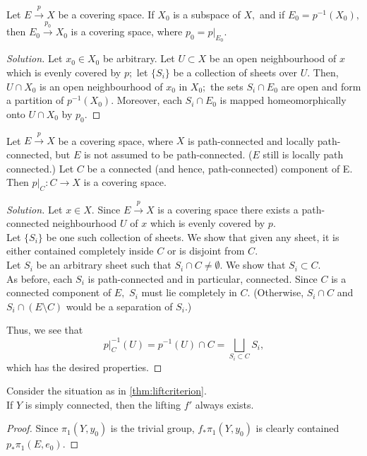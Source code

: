 \documentclass[12pt]{article}
\newenvironment{soln}{\begin{proof}[Solution]}{\end{proof}}
\begin{document}
\begin{exe} \label{exe:coveringspacerestrictiscovering1}
	Let $E\overset{p}{\longrightarrow}X$ be a covering space. If $X_0$ is a subspace of $X,$ and if $E_0 = p^{-1}(X_0),$ then $E_0\overset{p_0}{\longrightarrow}X_0$ is a covering space, where $p_0 = p|_{E_0}.$
\end{exe}
\begin{soln}
	Let $x_0 \in X_0$ be arbitrary. Let $U \subset X$ be an open neighbourhood of $x$ which is evenly covered by $p;$ let $\{S_i\}$ be a collection of sheets over $U.$ Then, $U \cap X_0$ is an open neighbourhood of $x_0$ in $X_0;$ the sets $S_i\cap E_0$ are open and form a partition of $p^{-1}(X_0).$ Moreover, each $S_i\cap E_0$ is mapped homeomorphically onto $U \cap X_0$ by $p_0.$
\end{soln}

\begin{exe} \label{exe:coveringspacerestrictiscovering2}
	Let $E\overset{p}{\longrightarrow}X$ be a covering space, where $X$ is path-connected and locally path-connected, but $E$ is not assumed to be path-connected. ($E$ still is locally path connected.) Let $C$ be a connected (and hence, path-connected) component of E. Then $p|_C:C\to X$ is a covering space.
\end{exe}
\begin{soln}
	Let $x \in X.$ Since $E\overset{p}{\longrightarrow}X$ is a covering space there exists a path-connected neighbourhood $U$ of $x$ which is evenly covered by $p.$ \\
	Let $\{S_i\}$ be one such collection of sheets. We show that given any sheet, it is either contained completely inside $C$ or is disjoint from $C.$\\
	Let $S_i$ be an arbitrary sheet such that $S_i \cap C \neq \emptyset.$ We show that $S_i \subset C.$\\
	As before, each $S_i$ is path-connected and in particular, connected. Since $C$ is a connected component of $E,$ $S_i$ must lie completely in $C.$ (Otherwise, $S_i \cap C$ and $S_i \cap (E \setminus C)$ would be a separation of $S_i$.)

	Thus, we see that
	\begin{equation*} 
		p|_C^{-1}(U) = p^{-1}(U) \cap C = \bigsqcup_{S_i \subset C}S_i,
	\end{equation*}
	which has the desired properties.
\end{soln}

\begin{cor} \label{cor:liftexists}
	Consider the situation as in \cref{thm:liftcriterion}. \\
	If $Y$ is simply connected, then the lifting $f'$ always exists.
\end{cor}
\begin{proof} 
	Since $\pi_1(Y, y_0)$ is the trivial group, $f_*\pi_1(Y, y_0)$ is clearly contained $p_*\pi_1(E, e_0).$	
\end{proof}
\end{document}
